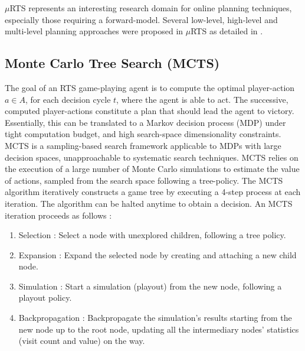 \documentclass[conference]{IEEEtran}
\newcommand{\mRTS}{$\mu$RTS}
\begin{document}
\mRTS{} represents an interesting research domain for online planning techniques, especially those requiring a forward-model. Several low-level, high-level and multi-level planning approaches were proposed in \mRTS{} as detailed in \cite{ouessai_online_2019}.


\subsection{Monte Carlo Tree Search (MCTS)}

The goal of an RTS game-playing agent is to compute the optimal player-action $a \in A$, for each decision cycle $t$, where the agent is able to act. The successive, computed player-actions constitute a plan that should lead the agent to victory. Essentially, this can be translated to a Markov decision process (MDP) under tight computation budget, and high search-space dimensionality constraints. MCTS is a sampling-based search framework applicable to MDPs with large decision spaces, unapproachable to systematic search techniques. MCTS relies on the execution of a large number of Monte Carlo simulations 
to estimate the value of actions, sampled from the search space following a tree-policy. The MCTS algorithm iteratively constructs a game tree by executing a 4-step process at each iteration. The algorithm can be halted anytime to obtain a decision. An MCTS iteration proceeds as follows : 

\begin{enumerate}
\item Selection : Select a node with unexplored children, following a tree policy.
\item Expansion : Expand the selected node by creating and attaching a new child node.
\item Simulation : Start a simulation (playout) from the new node, following a playout policy.
\item Backpropagation : Backpropagate the simulation's results starting from the new node up to the root node, updating all the intermediary nodes' statistics (visit count and value) on the way.
\end{enumerate}
\end{document}
